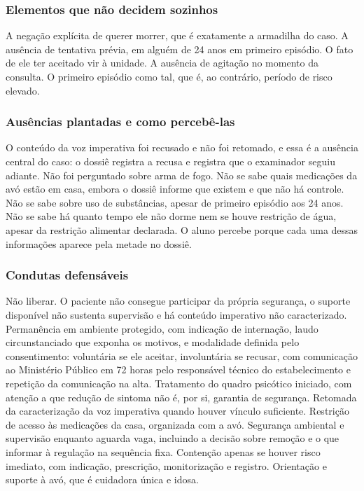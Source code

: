 \subsubsection*{Elementos que não decidem sozinhos}

A negação explícita de querer morrer, que é exatamente a armadilha do caso. A ausência de tentativa prévia, em alguém de 24 anos em primeiro episódio. O fato de ele ter aceitado vir à unidade. A ausência de agitação no momento da consulta. O primeiro episódio como tal, que é, ao contrário, período de risco elevado.

\subsubsection*{Ausências plantadas e como percebê-las}

O conteúdo da voz imperativa foi recusado e não foi retomado, e essa é a ausência central do caso: o dossiê registra a recusa e registra que o examinador seguiu adiante. Não foi perguntado sobre arma de fogo. Não se sabe quais medicações da avó estão em casa, embora o dossiê informe que existem e que não há controle. Não se sabe sobre uso de substâncias, apesar de primeiro episódio aos 24 anos. Não se sabe há quanto tempo ele não dorme nem se houve restrição de água, apesar da restrição alimentar declarada. O aluno percebe porque cada uma dessas informações aparece pela metade no dossiê.

\subsubsection*{Condutas defensáveis}

Não liberar. O paciente não consegue participar da própria segurança, o suporte disponível não sustenta supervisão e há conteúdo imperativo não caracterizado. Permanência em ambiente protegido, com indicação de internação, laudo circunstanciado que exponha os motivos, e modalidade definida pelo consentimento: voluntária se ele aceitar, involuntária se recusar, com comunicação ao Ministério Público em 72 horas pelo responsável técnico do estabelecimento e repetição da comunicação na alta. Tratamento do quadro psicótico iniciado, com atenção a que redução de sintoma não é, por si, garantia de segurança. Retomada da caracterização da voz imperativa quando houver vínculo suficiente. Restrição de acesso às medicações da casa, organizada com a avó. Segurança ambiental e supervisão enquanto aguarda vaga, incluindo a decisão sobre remoção e o que informar à regulação na sequência fixa. Contenção apenas se houver risco imediato, com indicação, prescrição, monitorização e registro. Orientação e suporte à avó, que é cuidadora única e idosa.

